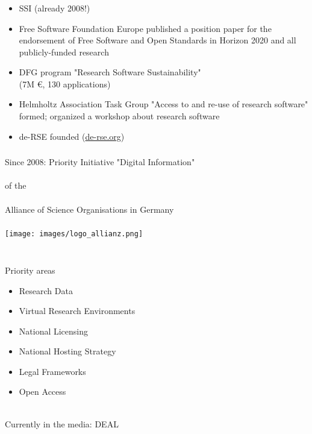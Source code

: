 \documentclass{beamer}
\begin{document}
\begin{frame}
  \frametitle{}
  \begin{block}{}
    {\normalsize
    \begin{itemize}
    \item SSI (already 2008!)
    \item Free Software Foundation Europe published a position paper
      for the endorsement of Free Software and Open Standards in
      Horizon 2020 and all publicly-funded research
    \item DFG program "Research Software Sustainability"\\
      (7M €, 130 applications)
    \item Helmholtz Association Task Group "Access to and re-use of
      research software" formed; organized a workshop about
      research software
    \item de-RSE founded (\href{http://de-rse.org}{de-rse.org})
    \end{itemize}
    }
  \end{block}
\end{frame}


\begin{frame}
  \frametitle{}
  \begin{center}
    Since 2008: Priority Initiative "Digital Information"\\  \ \\
    of the\\ \ \\
    Alliance of Science Organisations in Germany\\
    \ \\
    \texttt{[image: images/logo\_allianz.png]}\\
    \ \\
  \end{center}
\end{frame}


\begin{frame}
  \frametitle{}
    \begin{block}{}
      \begin{center}
        Priority areas
        \begin{itemize}
        \item Research Data
        \item Virtual Research Environments
        \item National Licensing
        \item National Hosting Strategy
        \item Legal Frameworks
        \item Open Access
        \end{itemize}
        \ \\
        \pause Currently in the media: DEAL
      \end{center}
    \end{block}
\end{frame}
\end{document}
